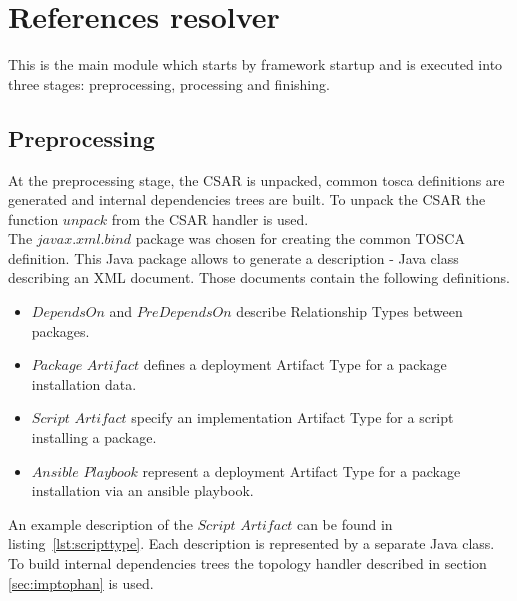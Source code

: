 \section{References resolver}
This is the main module which starts by framework startup and is executed into three stages: preprocessing, processing and finishing.

\subsection*{Preprocessing}
At the preprocessing stage, the CSAR is unpacked, common \gls{tosca} definitions are generated and internal dependencies trees are built. 
%
To unpack the CSAR the function $unpack$ from the CSAR handler is used.\\
%
The $javax$.$xml$.$bind$ package was chosen for creating the common TOSCA definition. 
This Java package allows to generate a description - Java class describing an XML document. 
Those documents contain the following definitions.
\begin{itemize}
	\item $DependsOn$ and $PreDependsOn$ describe Relationship Types %
	  between packages.%
	\item $Package$ $Artifact$ defines a deployment Artifact Type for a package installation data.
	\item $Script$ $Artifact$ specify an implementation Artifact Type for a script installing a package.
	\item $Ansible$ $Playbook$ represent a deployment Artifact Type for a package installation via an ansible playbook.
\end{itemize}
An example description of the $Script$ $Artifact$ can be found in listing~\ref{lst:scripttype}.
Each description is represented by a separate Java class.\\
%
To build internal dependencies trees the topology handler described in section \ref{sec:imptophan} is used. 

